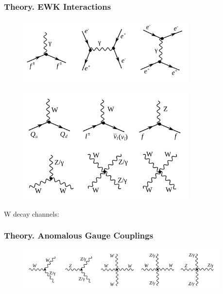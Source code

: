 \begin{frame}\frametitle{Theory. EWK Interactions}

\begin{figure}[htb]
  \begin{center}
    {\includegraphics[width=0.80\textwidth]{../figs/Intro/feynmEM.png}}
    \label{fig:feynmEM}
  \end{center}
\end{figure}

\begin{figure}[htb]
  \begin{center}
    {\includegraphics[width=0.80\textwidth]{../figs/Intro/feynmW.png}}
    \label{fig:feynmW}
  \end{center}
\end{figure}

  \scriptsize
   W decay channels:

\end{frame}%

\begin{frame}\frametitle{Theory. Anomalous Gauge Couplings}

\begin{figure}[htb]
  \begin{center}
    {\includegraphics[width=0.95\textwidth]{../figs/WgAbout/TGC_and_QGC_vertices.png}}
    \label{fig:TGC_and_QGC_vertices}
  \end{center}
\end{figure}

\end{frame}%

